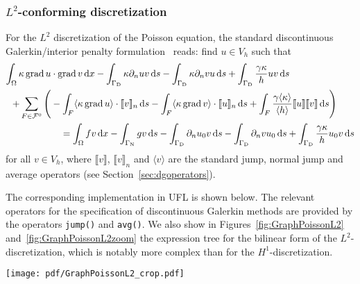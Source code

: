 \documentclass[prodmode,acmtoms]{acmsmall}
\DeclareMathOperator{\Grad}{grad}
\newcommand{\uflc}[1]{\texttt{#1}}
\newcommand{\jump}[1]{\llbracket #1 \rrbracket}
\newcommand{\avg}[1]{\langle #1 \rangle}
\newcommand{\dx}{\dif{}x}
\newcommand{\ds}{\dif{}s}
\newcommand{\GammaD}{\Gamma_{\mathrm{D}}}
\newcommand{\GammaN}{\Gamma_{\mathrm{N}}}
\begin{document}
\subsubsection{$L^2$-conforming discretization}

For the $L^2$ discretization of the Poisson equation, the standard
discontinuous Galerkin/interior penalty
formulation~\citep{Arnold1982,oelgaard:2008} reads: find $u \in V_h$
such that
\begin{equation}
  \label{eq:poisson,L2}
  \begin{split}
     \int_\Omega \kappa \Grad u &\cdot \Grad v \dx
     - \int_{\GammaD} \kappa \partial_n u v \ds
     - \int_{\GammaD} \kappa \partial_n v u \ds
     + \int_{\GammaD} \frac{\gamma\kappa}{h} uv \ds \\
     + \sum_{F\in\mathcal{F}^0} \Bigg(
    &- \int_F \avg{\kappa \Grad u} \cdot \jump{v}_n \ds
     - \int_F \avg{\kappa \Grad v} \cdot \jump{u}_n \ds
     + \int_F \frac{\gamma \avg{\kappa}}{\avg{h}}\jump{u}\jump{v} \ds \Bigg) \\
    &\quad
     = \int_{\Omega} fv \dx
     - \int_{\GammaN} gv \ds
     - \int_{\GammaD} \partial_n u_0 v \ds
     - \int_{\GammaD} \partial_n v u_0 \ds
     + \int_{\GammaD} \frac{\gamma\kappa}{h} u_0 v \ds
  \end{split}
\end{equation}
for all $v \in V_h$,
where $\jump{v}$, $\jump{v}_n$ and $\avg{v}$ are the standard jump,
normal jump and average operators (see Section~\ref{sec:dgoperators}).

The corresponding implementation in UFL is shown below. The relevant
operators for the specification of discontinuous Galerkin methods are
provided by the operators \uflc{jump()} and \uflc{avg()}. We also
show in Figures~\ref{fig:GraphPoissonL2}
and~\ref{fig:GraphPoissonL2zoom} the expression tree for the bilinear
form of the $L^2$-discretization, which is notably more complex than
for the $H^1$-discretization.


\begin{sidewaysfigure}
  \centering
  \texttt{[image: pdf/GraphPoissonL2\_crop.pdf]}
  \caption{Expression tree for the $L^2$ discretization of the Poisson
    equation~\eqref{eq:poisson,L2}.  This expression tree serves
    as an illustration of the complexity of the expression tree already
    for a moderately simple formulation like the $L^2$ discretization
    of the Poisson equation. A detail of this expression tree is plotted
    in Figure~\ref{fig:GraphPoissonL2zoom}.}
  \label{fig:GraphPoissonL2}
\end{sidewaysfigure}
\end{document}
